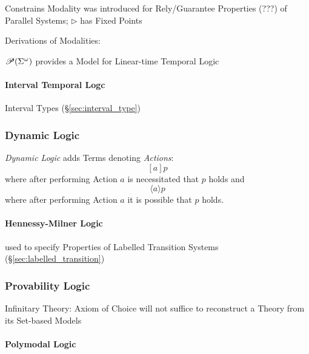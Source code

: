 Constrains Modality was introduced for Rely/Guarantee Properties (???)
of Parallel Systems; $\rhd$ has Fixed Points

Derivations of Modalities: %

$\mathscr{P}(\Sigma^\omega)$ provides a Model for Linear-time Temporal Logic
\cite{abramsky-gay-nagarajan96}



\paragraph{Interval Temporal Logc}\label{sec:interval_temporal}\hfill

Interval Types (\S\ref{sec:interval_type})



\subsubsection{Dynamic Logic}\label{sec:dynamic_logic}

\emph{Dynamic Logic} adds Terms denoting \emph{Actions}:
\[
  [a]p
\]
where after performing Action $a$ is necessitated that $p$ holds and
\[
  \langle a \rangle p
\]
where after performing Action $a$ it is possible that $p$ holds.



\paragraph{Hennessy-Milner Logic}\label{sec:hennessy_milner_logic}
\hfill

used to specify Properties of Labelled Transition Systems
(\S\ref{sec:labelled_transition})



\subsubsection{Provability Logic}\label{sec:provability_logic}

Infinitary Theory: Axiom of Choice will not suffice to reconstruct a
Theory from its Set-based Models



\paragraph{Polymodal Logic}\label{sec:polymodal_logic}\hfill

